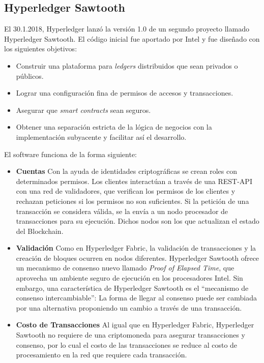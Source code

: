 \subsection{Hyperledger Sawtooth}
El 30.1.2018, Hyperledger lanzó la versión 1.0 de un segundo proyecto llamado Hyperledger Sawtooth.\cite{hls_release} El código inicial fue aportado por Intel y fue diseñado con los siguientes objetivos:\cite{hls_whatis}
\begin{itemize}
\item[\textendash] Construir una plataforma para \textit{ledgers} distribuidos que sean privados o públicos.
\item[\textendash] Lograr una configuración fina de permisos de accesos y transacciones.
\item[\textendash] Asegurar que \textit{smart contracts} sean seguros.
\item[\textendash] Obtener una separación estricta de la lógica de negocios con la implementación subyacente y facilitar así el desarrollo.
\end{itemize}

El software funciona de la forma siguiente:
\begin{itemize}
\item \textbf{Cuentas}\newline
Con la ayuda de identidades criptográficas se crean roles con determinados permisos. Los clientes interactúan a través de una REST-API con una red de validadores, que verifican los permisos de los clientes y rechazan peticiones si los permisos no son suficientes. Si la petición de una transacción se considera válida, se la envía a un nodo procesador de transacciones para su ejecución. Dichos nodos son los que actualizan el estado del Blockchain.
\item \textbf{Validación} \newline
Como en Hyperledger Fabric, la validación de transacciones y la creación de bloques ocurren en nodos diferentes. Hyperledger Sawtooth ofrece un mecanismo de consenso nuevo llamado \textit{Proof of Elapsed Time}, que aprovecha un ambiente seguro de ejecución en los procesadores Intel. Sin embargo, una característica de Hyperledger Sawtooth es el ``mecanismo de consenso intercambiable'': La forma de llegar al consenso puede ser cambiada por una alternativa proponiendo un cambio a través de una transacción.
\item \textbf{Costo de Transacciones} \newline
Al igual que en Hyperledger Fabric, Hyperledger Sawtooth no  requiere de una criptomoneda para asegurar transacciones y consenso, por lo cual el costo de las transacciones se reduce al costo de procesamiento en la red que requiere cada transacción.
\end{itemize}


